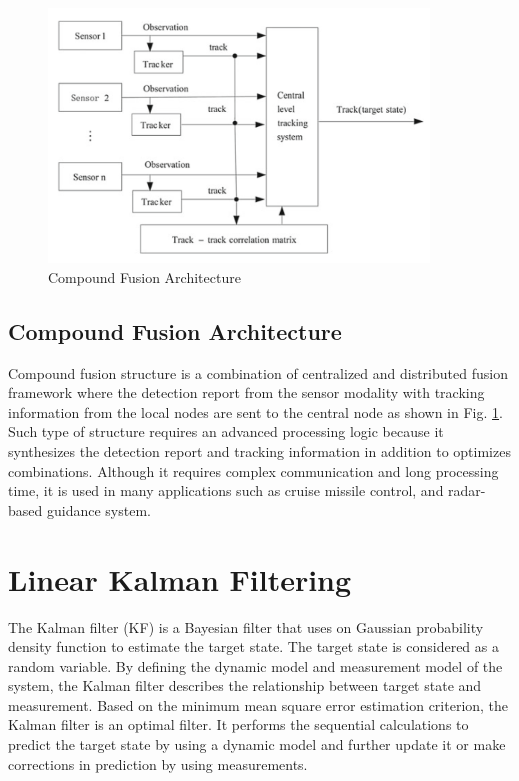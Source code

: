 \begin{figure}
    \centering
    \includegraphics[width=0.9\textwidth]{Images/hybrid.png}
    \caption{Compound Fusion Architecture \cite{yan}}
    \label{hybrid}
\end{figure}

\subsection{Compound Fusion Architecture}
Compound fusion structure is a combination of centralized and distributed fusion framework where the detection report from the sensor modality with tracking information from the local nodes are sent to the central node as shown in Fig. \ref{hybrid}. Such type of structure requires an advanced processing logic because it synthesizes the detection report and tracking information in addition to optimizes combinations. Although it requires complex communication and long processing time, it is used in many applications such as cruise missile control, and radar-based guidance system.

\section{Linear Kalman Filtering}
\label{linearkalmaanfilter}
The Kalman filter (KF) is a Bayesian filter that uses on Gaussian probability density function to estimate the target state. The target state is considered as a random variable. By defining the dynamic model and measurement model of the system, the Kalman filter describes the relationship between target state and measurement. Based on the minimum mean square error estimation criterion, the Kalman filter is an optimal filter. It performs the sequential calculations to predict the target state by using a dynamic model and further update it or make corrections in prediction by using measurements.  

